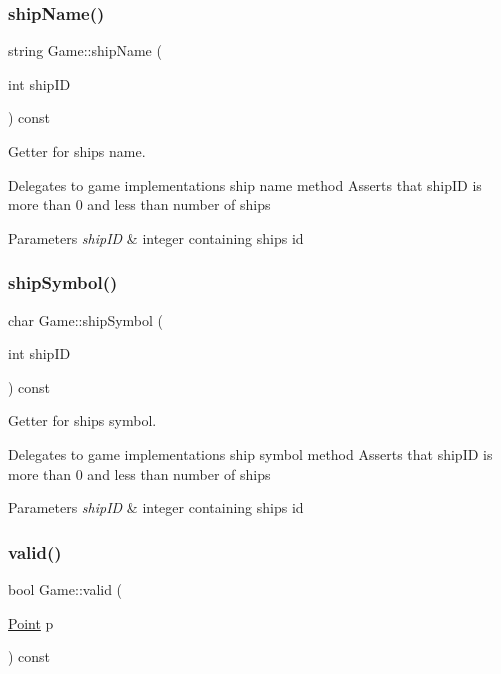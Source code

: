 \subsubsection{\texorpdfstring{ship\+Name()}{shipName()}}
{\footnotesize\ttfamily string Game\+::ship\+Name (\begin{DoxyParamCaption}\item[{int}]{ship\+ID }\end{DoxyParamCaption}) const}



Getter for ship\textquotesingle{}s name. 

Delegates to game implementations ship name method Asserts that ship\+ID is more than 0 and less than number of ships 
\begin{DoxyParams}{Parameters}
{\em ship\+ID} & integer containing ship\textquotesingle{}s id \\
\hline
\end{DoxyParams}
\mbox{\label{class_game_a4d7e709c85b6abd5defa24f5f78cd1d1}} 
\subsubsection{\texorpdfstring{ship\+Symbol()}{shipSymbol()}}
{\footnotesize\ttfamily char Game\+::ship\+Symbol (\begin{DoxyParamCaption}\item[{int}]{ship\+ID }\end{DoxyParamCaption}) const}



Getter for ship\textquotesingle{}s symbol. 

Delegates to game implementations ship symbol method Asserts that ship\+ID is more than 0 and less than number of ships 
\begin{DoxyParams}{Parameters}
{\em ship\+ID} & integer containing ship\textquotesingle{}s id \\
\hline
\end{DoxyParams}
\mbox{\label{class_game_a3ec9ae2ce5d1ac1cbf4ed18aa7141744}} 
\subsubsection{\texorpdfstring{valid()}{valid()}}
{\footnotesize\ttfamily bool Game\+::valid (\begin{DoxyParamCaption}\item[{\mbox{\hyperlink{class_point}{Point}}}]{p }\end{DoxyParamCaption}) const}




